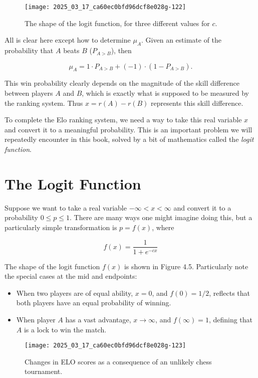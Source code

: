 \documentclass[10pt]{article}
\begin{document}
\begin{figure}[h!]
    \centering
    \texttt{[image: 2025\_03\_17\_ca60ec0bfd96dcf8e028g-122]}
    \caption{The shape of the logit function, for three different values for $c$.}
\end{figure}

All is clear here except how to determine $\mu_{A}$. Given an estimate of the probability that $A$ beats $B$ ($P_{A>B}$), then

\[
\mu_{A} = 1 \cdot P_{A>B} + (-1) \cdot (1 - P_{A>B}).
\]

This win probability clearly depends on the magnitude of the skill difference between players $A$ and $B$, which is exactly what is supposed to be measured by the ranking system. Thus $x = r(A) - r(B)$ represents this skill difference.

To complete the Elo ranking system, we need a way to take this real variable $x$ and convert it to a meaningful probability. This is an important problem we will repeatedly encounter in this book, solved by a bit of mathematics called the \textit{logit function}.

\section*{The Logit Function}
Suppose we want to take a real variable $-\infty < x < \infty$ and convert it to a probability $0 \leq p \leq 1$. There are many ways one might imagine doing this, but a particularly simple transformation is $p = f(x)$, where

\[
f(x) = \frac{1}{1 + e^{-cx}}
\]

The shape of the logit function $f(x)$ is shown in Figure 4.5. Particularly note the special cases at the mid and endpoints:

\begin{itemize}
    \item When two players are of equal ability, $x = 0$, and $f(0) = 1/2$, reflects that both players have an equal probability of winning.
    \item When player $A$ has a vast advantage, $x \rightarrow \infty$, and $f(\infty) = 1$, defining that $A$ is a lock to win the match.
\end{itemize}

\begin{figure}[h!]
    \centering
    \texttt{[image: 2025\_03\_17\_ca60ec0bfd96dcf8e028g-123]}
    \caption{Changes in ELO scores as a consequence of an unlikely chess tournament.}
\end{figure}
\end{document}
